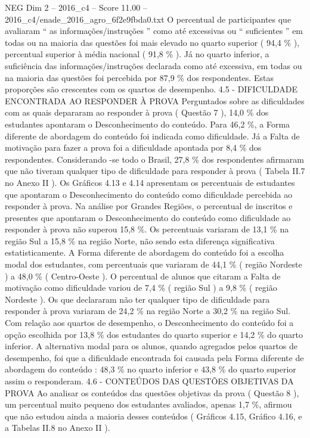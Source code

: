 \begin{textsample}{NEG Dim 2 – 2016\_c4 – Score 11.00 – 2016\_c4/enade\_2016\_agro\_6f2e9fbda0.txt}
O percentual de participantes que avaliaram “ as informações/instruções ” como até excessivas ou “ suficientes ” em todas ou na maioria das questões foi mais elevado no quarto superior ( 94,4 \% ), percentual superior à média nacional ( 91,8 \% ).
Já no quarto inferior, a suficiência das informações/instruções declarada como até excessiva, em todas ou na maioria das questões foi percebida por 87,9 \% dos respondentes.
Estas proporções são crescentes com os quartos de desempenho. 4.5 - DIFICULDADE ENCONTRADA AO RESPONDER À PROVA Perguntados sobre as dificuldades com as quais depararam ao responder à prova ( Questão 7 ), 14,0 \% dos estudantes apontaram o Desconhecimento do conteúdo.
Para 46,2 \%, a Forma diferente de abordagem do conteúdo foi indicada como dificuldade.
Já a Falta de motivação para fazer a prova foi a dificuldade apontada por 8,4 \% dos respondentes.
Considerando -se todo o Brasil, 27,8 \% dos respondentes afirmaram que não tiveram qualquer tipo de dificuldade para responder à prova ( Tabela II.7 no Anexo II ).
Os Gráficos 4.13 e 4.14 apresentam os percentuais de estudantes que apontaram o Desconhecimento do conteúdo como dificuldade percebida ao responder à prova.
Na análise por Grandes Regiões, o percentual de inscritos e presentes que apontaram o Desconhecimento do conteúdo como dificuldade ao responder à prova não superou 15,8 \%.
Os percentuais variaram de 13,1 \% na região Sul a 15,8 \% na região Norte, não sendo esta diferença significativa estatisticamente.
A Forma diferente de abordagem do conteúdo foi a escolha modal dos estudantes, com percentuais que variaram de 44,1 \% ( região Nordeste ) a 48,0 \% ( Centro-Oeste ).
O percentual de alunos que citaram a Falta de motivação como dificuldade variou de 7,4 \% ( região Sul ) a 9,8 \% ( região Nordeste ).
Os que declararam não ter qualquer tipo de dificuldade para responder à prova variaram de 24,2 \% na região Norte a 30,2 \% na região Sul.
Com relação aos quartos de desempenho, o Desconhecimento do conteúdo foi a opção escolhida por 13,8 \% dos estudantes do quarto superior e 14,2 \% do quarto inferior.
A alternativa modal para os alunos, quando agregados pelos quartos de desempenho, foi que a dificuldade encontrada foi causada pela Forma diferente de abordagem do conteúdo : 48,3 \% no quarto inferior e 43,8 \% do quarto superior assim o responderam. 4.6 - CONTEÚDOS DAS QUESTÕES OBJETIVAS DA PROVA Ao analisar os conteúdos das questões objetivas da prova ( Questão 8 ), um percentual muito pequeno dos estudantes avaliados, apenas 1,7 \%, afirmou que não estudou ainda a maioria desses conteúdos ( Gráficos 4.15, Gráfico 4.16, e a Tabelas II.8 no Anexo II ).

\end{textsample}
